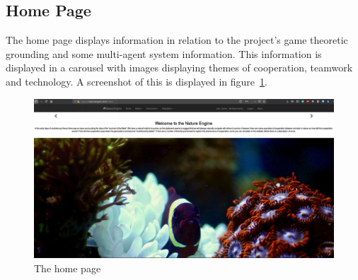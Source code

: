 \documentclass[]{final_report}
\begin{document}
\subsection{Home Page}
The home page displays information in relation to the project's game theoretic grounding and some multi-agent system information. This information is displayed in a carousel with images displaying themes of cooperation, teamwork and technology. A screenshot of this is displayed in figure~\ref{fig:home_page}.
\begin{figure}
	\includegraphics[width=\textwidth]{HomePage.png}
	\caption{The home page}
	\label{fig:home_page}
\end{figure}
\end{document}
